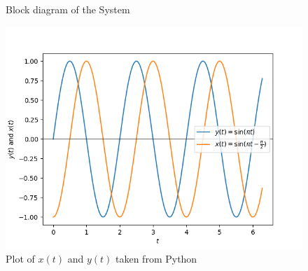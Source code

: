 \documentclass[journal,12pt,twocolumn]{IEEEtran}
\theoremstyle{remark}
\begin{document}
\begin{figure}[htb]
  \centering
  
  \captionsetup{justification=centering, singlelinecheck=off}
  \caption{Block diagram of the System}
  \label{fig:tikz_circuit}
\end{figure}

\begin{figure}[h]
  \centering
  \includegraphics[width=\columnwidth]{./figs/fig1.png} 
  \captionsetup{justification=centering}
  \caption{Plot of $x(t)$ and $y(t)$ taken from Python}
  \label{fig:your_label}
\end{figure}

 
\end{document}
